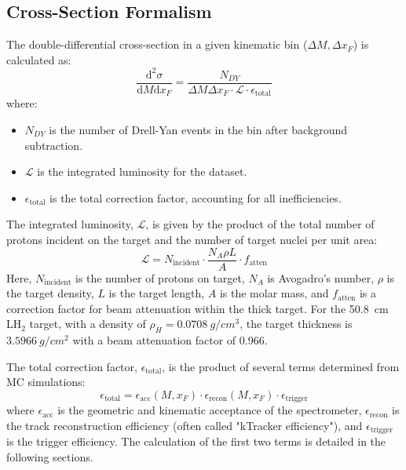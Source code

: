 \documentclass[11pt]{article}
\newcommand{\diffd}{\mathrm{d}}
\begin{document}
\subsection{Cross-Section Formalism}
The double-differential cross-section in a given kinematic bin ($\Delta M, \Delta x_F$) is calculated as:
\begin{equation}
\frac{\diffd^{2}\sigma}{\diffd M \diffd x_{F}} = \frac{N_{DY}}{\Delta M \Delta x_{F} \cdot \mathcal{L} \cdot \epsilon_{\text{total}}}
\label{eq:modified_cross_section}
\end{equation}
where:
\begin{itemize}
    \item $N_{DY}$ is the number of Drell-Yan events in the bin after background subtraction.
    \item $\mathcal{L}$ is the integrated luminosity for the dataset.
    \item $\epsilon_{\text{total}}$ is the total correction factor, accounting for all inefficiencies.
\end{itemize}
The integrated luminosity, $\mathcal{L}$, is given by the product of the total number of protons incident on the target and the number of target nuclei per unit area:
\begin{equation}
\mathcal{L} = N_{\text{incident}} \cdot \frac{N_{A} \rho L}{A} \cdot f_{\text{atten}}
\label{eq:luminosity}
\end{equation}
Here, $N_{\text{incident}}$ is the number of protons on target, $N_A$ is Avogadro's number, $\rho$ is the target density, $L$ is the target length, $A$ is the molar mass, and $f_{\text{atten}}$ is a correction factor for beam attenuation within the thick target. For the \SI{50.8}{cm} LH$_2$ target, with a density of $\rho_H = \SI{0.0708}{g/cm^3}$, the target thickness is $3.5966\ g/cm^{2}$ with a beam attenuation factor of 0.966.

The total correction factor, $\epsilon_{\text{total}}$, is the product of several terms determined from MC simulations:
\begin{equation}
\epsilon_{\text{total}} = \epsilon_{\text{acc}}(M,x_{F}) \cdot \epsilon_{\text{recon}}(M,x_{F}) \cdot \epsilon_{\text{trigger}}
\end{equation}
where $\epsilon_{\text{acc}}$ is the geometric and kinematic acceptance of the spectrometer, $\epsilon_{\text{recon}}$ is the track reconstruction efficiency (often called "kTracker efficiency"), and $\epsilon_{\text{trigger}}$ is the trigger efficiency. The calculation of the first two terms is detailed in the following sections.
\end{document}
